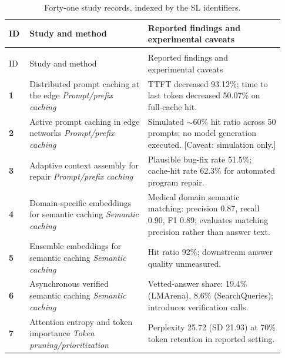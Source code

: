 \IfFileExists{jair.cls}{\documentclass{jair}}{\documentclass[manuscript,nonacm,screen]{acmart}}
\renewcommand{\arraystretch}{1.13}
\begin{document}
{\footnotesize
\setlength{\tabcolsep}{3pt}
\renewcommand{\arraystretch}{1.1}
\begin{longtable}{@{}>{\RaggedRight\arraybackslash}p{0.07\linewidth} >{\RaggedRight\arraybackslash}p{0.40\linewidth} >{\RaggedRight\arraybackslash}p{0.46\linewidth}@{}}
\caption{Forty-one study records, indexed by the SL identifiers.}\label{tab:forty-one}\\
\toprule
ID & Study and method & Reported findings and experimental caveats \\
\midrule
\endfirsthead
\multicolumn{3}{l}{\footnotesize Table continued from previous page}\\
\toprule ID & Study and method & Reported findings and experimental caveats \\
\midrule
\endhead
\bottomrule
\endfoot
\textbf{1} & Distributed prompt caching at the edge \cite{S01}\newline\emph{Prompt/prefix caching} & TTFT decreased 93.12\%; time to last token decreased 50.07\% on full-cache hit. \\
\textbf{2} & Active prompt caching in edge networks \cite{S02}\newline\emph{Prompt/prefix caching} & Simulated $\sim$60\% hit ratio across 50 prompts; no model generation executed. [Caveat: simulation only.] \\
\textbf{3} & Adaptive context assembly for repair \cite{S03}\newline\emph{Prompt/prefix caching} & Plausible bug-fix rate 51.5\%; cache-hit rate 62.3\% for automated program repair. \\
\textbf{4} & Domain-specific embeddings for semantic caching \cite{S04}\newline\emph{Semantic caching} & Medical domain semantic matching: precision 0.87, recall 0.90, F1 0.89; evaluates matching precision rather than answer text. \\
\textbf{5} & Ensemble embeddings for semantic caching \cite{S05}\newline\emph{Semantic caching} & Hit ratio 92\%; downstream answer quality unmeasured. \\
\textbf{6} & Asynchronous verified semantic caching \cite{S06}\newline\emph{Semantic caching} & Vetted-answer share: 19.4\% (LMArena), 8.6\% (SearchQueries); introduces verification calls. \\
\textbf{7} & Attention entropy and token importance \cite{S07}\newline\emph{Token pruning/prioritization} & Perplexity 25.72 (SD 21.93) at 70\% token retention in reported setting. \\

\end{longtable}}
\end{document}
